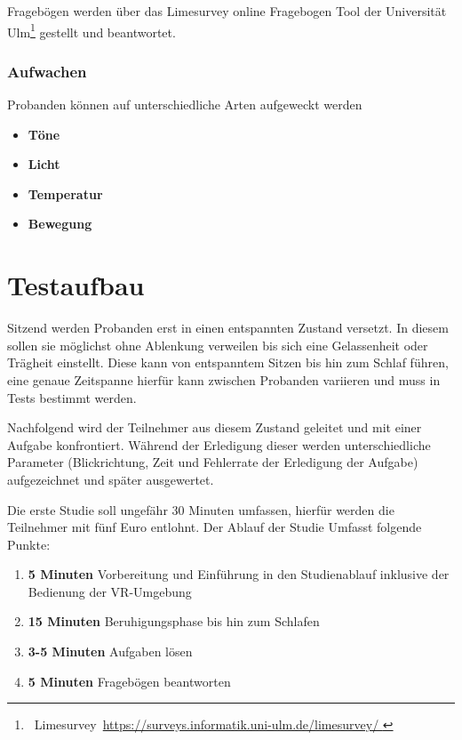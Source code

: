 \documentclass[a4paper, 11pt]{article}
\begin{document}
Fragebögen werden über das Limesurvey online Fragebogen Tool der Universität Ulm\footnote{~Limesurvey~\url{https://surveys.informatik.uni-ulm.de/limesurvey/
}} gestellt und beantwortet. 

\subsubsection*{Aufwachen}
Probanden können auf unterschiedliche Arten aufgeweckt werden~\cite{jewett1999time, ferrara2000sleep}
\begin{itemize}
    \item \textbf{Töne}
    \item \textbf{Licht}
    \item \textbf{Temperatur}
    \item \textbf{Bewegung}
\end{itemize}

\section*{Testaufbau}
Sitzend werden Probanden erst in einen entspannten Zustand versetzt. In diesem sollen sie möglichst ohne Ablenkung verweilen bis sich eine Gelassenheit oder Trägheit einstellt. Diese kann von entspanntem Sitzen bis hin zum Schlaf führen, eine genaue Zeitspanne hierfür kann zwischen Probanden variieren und muss in Tests bestimmt werden.

Nachfolgend wird der Teilnehmer aus diesem Zustand geleitet und mit einer Aufgabe konfrontiert. Während der Erledigung dieser werden unterschiedliche Parameter (Blickrichtung, Zeit und Fehlerrate der Erledigung der Aufgabe) aufgezeichnet und später ausgewertet.

Die erste Studie soll ungefähr 30 Minuten umfassen, hierfür werden die Teilnehmer mit fünf Euro entlohnt. Der Ablauf der Studie Umfasst folgende Punkte:

\begin{enumerate}
    \item \textbf{5 Minuten} Vorbereitung und Einführung in den Studienablauf inklusive der Bedienung der VR-Umgebung
    \item \textbf{15 Minuten} Beruhigungsphase bis hin zum Schlafen
    \item \textbf{3-5 Minuten} Aufgaben lösen
    \item \textbf{5 Minuten} Fragebögen beantworten
\end{enumerate}
\end{document}
